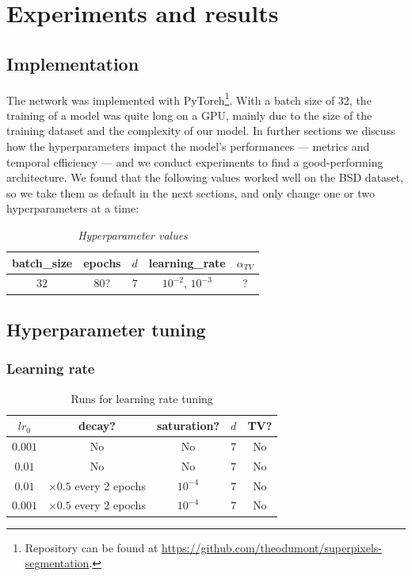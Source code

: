 \documentclass{article}
\begin{document}
\section{Experiments and results}
    \subsection{Implementation}
    The network was implemented with PyTorch\footnote{Repository can be found at \url{https://github.com/theodumont/superpixels-segmentation}.}. With a batch size of 32, the training of a model was quite long on a GPU, mainly due to the size of the training dataset and the complexity of our model. In further sections we discuss how the hyperparameters impact the model's performances --- metrics and temporal efficiency --- and we conduct experiments to find a good-performing architecture. We found that the following values worked well on the BSD dataset, so we take them as default in the next sections, and only change one or two hyperparameters at a time:
    \begin{table}[!ht]
        \centering
        \begin{tabular}{|c|c|c|c|c|}
            \hline
            batch\_size & epochs & $d$ & learning\_rate & $\alpha_{TV}$ \\
            \hline
            \hline
            32 & 80? & $7$ & $10^{-2}$, $10^{-3}$ & ? \\
            \hline
        \end{tabular}
        \caption{\textit{Hyperparameter values}}
    \end{table}


    \subsection{Hyperparameter tuning}
        \subsubsection{Learning rate}
            \begin{table}[!ht]
                \center
                \begin{tabular}{|c|c|c|c|c|}
                    \hline
                    $lr_0$ & decay? & saturation? & $d$ & TV? \\
                    \hline \hline
                    $0.001$ & No & No & $7$ & No \\
                    \hline
                    $0.01$ & No & No & $7$ & No \\
                    \hline
                    $0.01$ & $\times 0.5$ every 2 epochs & $10^{-4}$ & $7$ & No \\
                    \hline
                    $0.001$ & $\times 0.5$ every 2 epochs & $10^{-4}$ & $7$ & No \\
                    \hline
                \end{tabular}
            \caption{Runs for learning rate tuning}
            \end{table}
\end{document}
